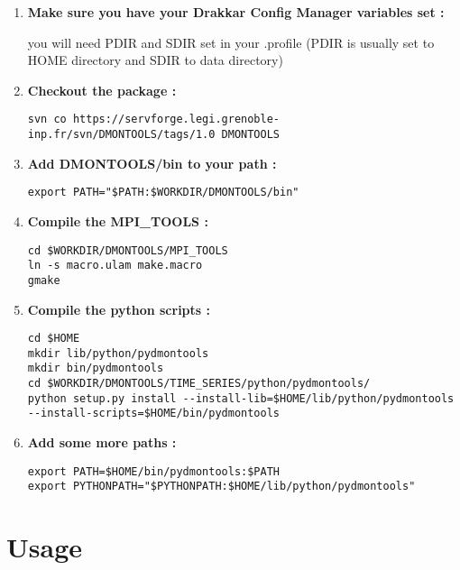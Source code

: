 \documentclass[a4paper,11pt]{article}
\begin{document}
\begin{enumerate}

\item \textbf{Make sure you have your Drakkar Config Manager variables set :}

you will need PDIR and SDIR set in your .profile (PDIR is usually set to HOME directory and
SDIR to data directory)

\item \textbf{Checkout the package :}

\begin{verbatim}
svn co https://servforge.legi.grenoble-inp.fr/svn/DMONTOOLS/tags/1.0 DMONTOOLS
\end{verbatim}

\item \textbf{Add DMONTOOLS/bin to your path :}

\begin{verbatim}
export PATH="$PATH:$WORKDIR/DMONTOOLS/bin"
\end{verbatim}

\item \textbf{Compile the MPI\_TOOLS :}

\begin{verbatim}
cd $WORKDIR/DMONTOOLS/MPI_TOOLS
ln -s macro.ulam make.macro
gmake
\end{verbatim}

\item \textbf{Compile the python scripts :}

\begin{verbatim}
cd $HOME
mkdir lib/python/pydmontools
mkdir bin/pydmontools
cd $WORKDIR/DMONTOOLS/TIME_SERIES/python/pydmontools/
python setup.py install --install-lib=$HOME/lib/python/pydmontools  
--install-scripts=$HOME/bin/pydmontools
\end{verbatim}

\item \textbf{Add some more paths :}

\begin{verbatim}
export PATH=$HOME/bin/pydmontools:$PATH
export PYTHONPATH="$PYTHONPATH:$HOME/lib/python/pydmontools"
\end{verbatim}

\end{enumerate}

\clearpage
\newpage

\section{Usage}
\end{document}
